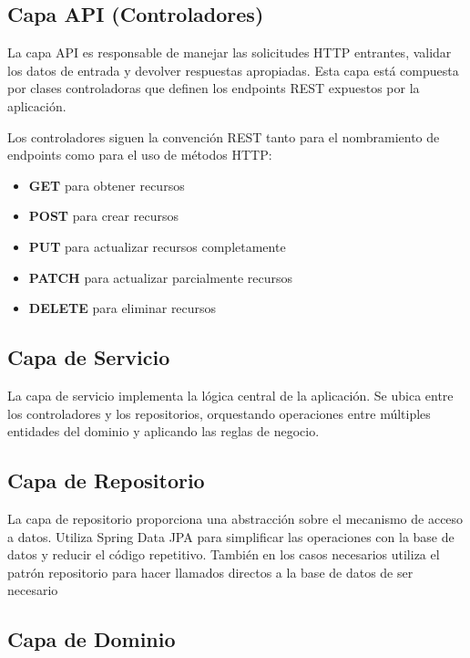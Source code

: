 \documentclass[11pt,a4paper]{article}
\begin{document}
\subsection{Capa API (Controladores)}

La capa API es responsable de manejar las solicitudes HTTP entrantes, validar los datos de entrada y devolver respuestas apropiadas.
Esta capa está compuesta por clases controladoras que definen los endpoints REST expuestos por la aplicación.

Los controladores siguen la convención REST tanto para el nombramiento de endpoints como para el uso de métodos HTTP:

\begin{itemize}
	\item \textbf{GET} para obtener recursos
	\item \textbf{POST} para crear recursos
	\item \textbf{PUT} para actualizar recursos completamente
	\item \textbf{PATCH} para actualizar parcialmente recursos
	\item \textbf{DELETE} para eliminar recursos
\end{itemize}

\subsection{Capa de Servicio}

La capa de servicio implementa la lógica central de la aplicación.
Se ubica entre los controladores y los repositorios, orquestando operaciones entre múltiples entidades del dominio y aplicando las reglas de negocio.

\subsection{Capa de Repositorio}

La capa de repositorio proporciona una abstracción sobre el mecanismo de acceso a datos.
Utiliza Spring Data JPA para simplificar las operaciones con la base de datos y reducir el código repetitivo.
También en los casos necesarios utiliza el patrón repositorio para hacer llamados directos a la base de datos de ser necesario

\subsection{Capa de Dominio}
\end{document}
